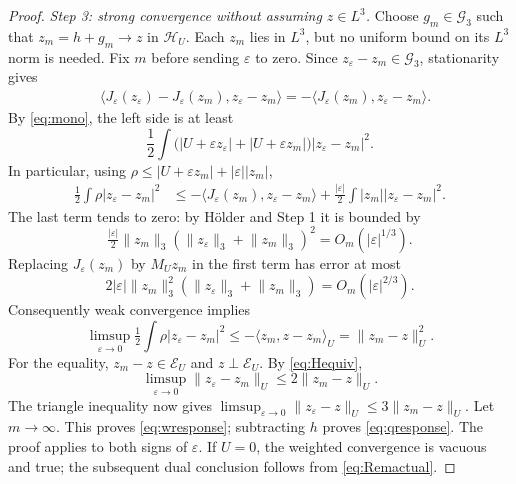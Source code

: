 \documentclass[11pt,a4paper]{article}
\theoremstyle{definition}\newtheorem{definition}[theorem]{Definition}
\theoremstyle{remark}\newtheorem{remark}[theorem]{Remark}
\newcommand{\G}{\mathcal G_3}
\newcommand{\HH}{\mathcal H}
\newcommand{\GG}{\mathcal E}
\newcommand{\norm}[1]{\lVert #1\rVert}
\newcommand{\ip}[2]{\langle #1,#2\rangle}
\numberwithin{equation}{section}
\begin{document}
\begin{proof}
\emph{Step 3: strong convergence without assuming $z\in L^3$.}
Choose $g_m\in\G$ such that
$z_m=h+g_m\to z$ in $\HH_U$. Each $z_m$ lies in $L^3$, but no uniform bound on its $L^3$ norm is needed. Fix $m$ before sending $\varepsilon$ to zero. Since $z_\varepsilon-z_m\in\G$, stationarity gives
\begin{align}
 &\ip{J_\varepsilon(z_\varepsilon)-J_\varepsilon(z_m)}{z_\varepsilon-z_m}
   =-\ip{J_\varepsilon(z_m)}{z_\varepsilon-z_m}.\label{eq:strongstation}
\end{align}
By \eqref{eq:mono}, the left side is at least
\[
 \frac12\int\bigl(|U+\varepsilon z_\varepsilon|+|U+\varepsilon z_m|\bigr)
                  |z_\varepsilon-z_m|^2.
\]
In particular, using $\rho\le|U+\varepsilon z_m|+|\varepsilon||z_m|$,
\begin{align}
 \tfrac12\int\rho|z_\varepsilon-z_m|^2
 &\le-\ip{J_\varepsilon(z_m)}{z_\varepsilon-z_m}
       +\tfrac{|\varepsilon|}{2}\int|z_m||z_\varepsilon-z_m|^2.\label{eq:strongbase}
\end{align}
The last term tends to zero: by H\"older and Step 1 it is bounded by
\[
 \tfrac{|\varepsilon|}{2}\norm{z_m}_3
       (\norm{z_\varepsilon}_3+\norm{z_m}_3)^2
 =O_m(|\varepsilon|^{1/3}).
\]
Replacing $J_\varepsilon(z_m)$ by $M_Uz_m$ in the first term has error at most
\[
 2|\varepsilon|\norm{z_m}_3^2
 (\norm{z_\varepsilon}_3+\norm{z_m}_3)
 =O_m(|\varepsilon|^{2/3}).
\]
Consequently weak convergence implies
\[
 \limsup_{\varepsilon\to0}\tfrac12\int\rho|z_\varepsilon-z_m|^2
 \le-\ip{z_m}{z-z_m}_U
 =\norm{z_m-z}_U^2.
\]
For the equality, $z_m-z\in\GG_U$ and $z\perp\GG_U$. By \eqref{eq:Hequiv},
\[
 \limsup_{\varepsilon\to0}\norm{z_\varepsilon-z_m}_U
 \le2\norm{z_m-z}_U.
\]
The triangle inequality now gives
$\limsup_{\varepsilon\to0}\norm{z_\varepsilon-z}_U
\le3\norm{z_m-z}_U$.
Let $m\to\infty$. This proves \eqref{eq:wresponse}; subtracting $h$ proves \eqref{eq:qresponse}. The proof applies to both signs of $\varepsilon$. If $U=0$, the weighted convergence is vacuous and true; the subsequent dual conclusion follows from \eqref{eq:Remactual}.
\end{proof}
\end{document}
